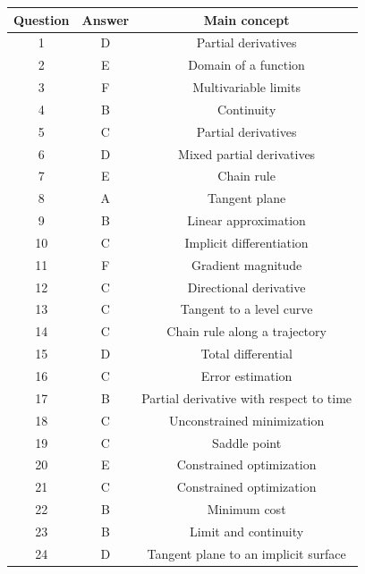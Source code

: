 \documentclass[a4paper,12pt]{article}
\theoremstyle{mystyle}
\numberwithin{equation}{section}
\numberwithin{theorem}{section}
\numberwithin{proposition}{section}
\numberwithin{example}{section}
\numberwithin{remark}{section}
\numberwithin{lemma}{section}
\numberwithin{corollary}{section}
\numberwithin{definition}{section}
\begin{document}
\begin{center}
\renewcommand{\arraystretch}{1.3}
\begin{tabular}{|c|c|c|}
\textbf{Question} & \textbf{Answer} & \textbf{Main concept}\\
\hline
1 & D & Partial derivatives\\
2 & E & Domain of a function\\
3 & F & Multivariable limits\\
4 & B & Continuity\\
5 & C & Partial derivatives\\
6 & D & Mixed partial derivatives\\
7 & E & Chain rule\\
8 & A & Tangent plane\\
9 & B & Linear approximation\\
10 & C & Implicit differentiation\\
11 & F & Gradient magnitude\\
12 & C & Directional derivative\\
13 & C & Tangent to a level curve\\
14 & C & Chain rule along a trajectory\\
15 & D & Total differential\\
16 & C & Error estimation\\
17 & B & Partial derivative with respect to time\\
18 & C & Unconstrained minimization\\
19 & C & Saddle point\\
20 & E & Constrained optimization\\
21 & C & Constrained optimization\\
22 & B & Minimum cost\\
23 & B & Limit and continuity\\
24 & D & Tangent plane to an implicit surface\\
\hline
\end{tabular}
\end{center}
\printbibliography
\end{document}
